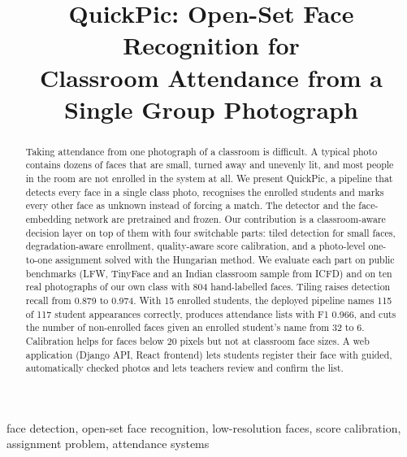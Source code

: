 \documentclass[conference,a4paper]{IEEEtran}
\begin{document}
\title{QuickPic: Open-Set Face Recognition for\\Classroom Attendance from a Single Group Photograph}

\author{
}

\maketitle

\begin{abstract}
Taking attendance from one photograph of a classroom is difficult. A typical photo contains dozens of faces that are small, turned away and unevenly lit, and most people in the room are not enrolled in the system at all. We present QuickPic, a pipeline that detects every face in a single class photo, recognises the enrolled students and marks every other face as unknown instead of forcing a match. The detector and the face-embedding network are pretrained and frozen. Our contribution is a classroom-aware decision layer on top of them with four switchable parts: tiled detection for small faces, degradation-aware enrollment, quality-aware score calibration, and a photo-level one-to-one assignment solved with the Hungarian method. We evaluate each part on public benchmarks (LFW, TinyFace and an Indian classroom sample from ICFD) and on ten real photographs of our own class with 804 hand-labelled faces. Tiling raises detection recall from 0.879 to 0.974. With 15 enrolled students, the deployed pipeline names 115 of 117 student appearances correctly, produces attendance lists with F1 0.966, and cuts the number of non-enrolled faces given an enrolled student's name from 32 to 6. Calibration helps for faces below 20 pixels but not at classroom face sizes. A web application (Django API, React frontend) lets students register their face with guided, automatically checked photos and lets teachers review and confirm the list.
\end{abstract}

\begin{IEEEkeywords}
face detection, open-set face recognition, low-resolution faces, score calibration, assignment problem, attendance systems
\end{IEEEkeywords}
\end{document}
